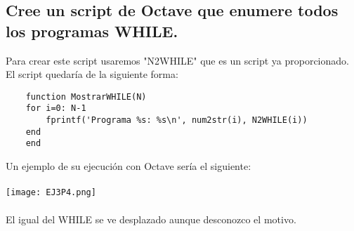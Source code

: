 \documentclass{article}
\begin{document}
\subsection*{Cree un script de Octave que enumere todos los programas WHILE.}
Para crear este script usaremos "N2WHILE" que es un script ya proporcionado. El script quedaría de la siguiente forma:
\begin{verbatim}
    function MostrarWHILE(N)
    for i=0: N-1
        fprintf('Programa %s: %s\n', num2str(i), N2WHILE(i))
    end
    end
\end{verbatim}
Un ejemplo de su ejecución con Octave sería el siguiente:
\\
\\ \texttt{[image: EJ3P4.png]}
\\
\\El igual del WHILE se ve desplazado aunque desconozco el motivo.
\end{document}
